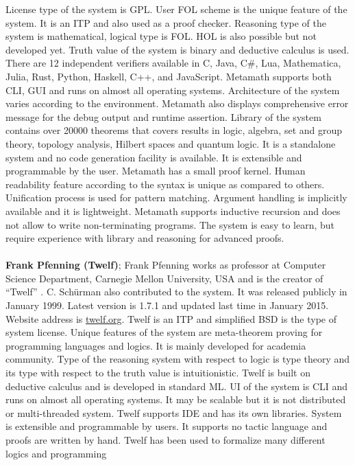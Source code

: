 License type of the system is GPL. User FOL scheme is the unique feature of the system. 
It is an ITP and also used as a proof checker. Reasoning type of the system is mathematical, logical type is FOL. 
HOL is also possible but not developed yet. Truth value of the system is binary and deductive calculus
is used. There are 12 independent verifiers available in C, Java, C\#, Lua, Mathematica, Julia, Rust, Python, Haskell, C++, and 
JavaScript. Metamath supports both CLI, GUI and runs on almost all operating systems. 
Architecture of the system 
varies according to the environment. Metamath also displays comprehensive error message for the debug output and runtime assertion. 
Library of the system contains over 20000 theorems that covers results in logic, algebra, set and group theory, topology analysis, 
Hilbert spaces and quantum logic. It is a standalone system and no code generation facility is available. 
It is extensible and programmable by the user. 
Metamath has a small proof kernel. Human readability feature according to the syntax is unique as compared to others. Unification process is 
used for pattern matching. Argument handling is implicitly available and it is lightweight. Metamath supports inductive recursion and 
does not allow to write non-terminating programs. The system is easy to learn, but require experience with library and reasoning for advanced
proofs.
\\\\
{\bf Frank Pfenning (Twelf)};
Frank Pfenning works as professor at Computer Science Department, Carnegie Mellon University, USA and is the creator of ``Twelf''
. C. Sch\"{u}rman  also contributed to the system. It was released publicly in January 1999. Latest version is 1.7.1 and 
updated last time in January 2015. Website address is \url{twelf.org}. 
Twelf is an ITP and simplified BSD is the type of system license. Unique features of the system are meta-theorem proving for programming 
languages and logics. It is mainly developed for academia community. 
Type of the reasoning system with respect to logic is type theory and its type with respect to the truth value is intuitionistic. 
Twelf is built on deductive calculus and is developed in standard ML. 
UI of the system is CLI and runs on almost all operating systems. It may be scalable but it is not distributed 
or multi-threaded system. Twelf supports IDE and has its own libraries. System is extensible and programmable by users. 
It supports no tactic language and proofs are written by hand. Twelf has been used to formalize many different logics and programming
